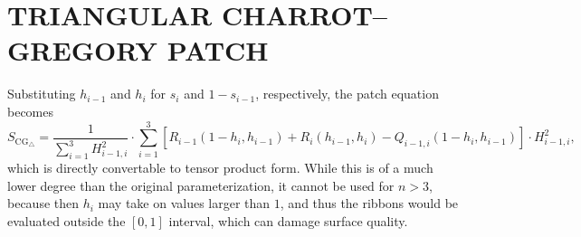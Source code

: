 \documentclass[9pt,academicons]{article}
\begin{document}
\section{TRIANGULAR CHARROT--GREGORY PATCH}
\label{app:triangular}
Substituting $h_{i-1}$ and $h_i$ for $s_i$ and $1-s_{i-1}$, respectively, the patch equation becomes
\begin{equation}
  S_\mathrm{CG_\triangle}= \frac{1}{\sum_{i=1}^3H_{i-1,i}^2}\cdot
  \sum_{i=1}^3\left[R_{i-1}(1-h_i,h_{i-1})+R_i(h_{i-1},h_i)-Q_{i-1,i}(1-h_i,h_{i-1})\right]
  \cdot H_{i-1,i}^2,
\end{equation}
which is directly convertable to tensor product form. While this is of a much lower degree
than the original parameterization, it cannot be used for $n>3$, because then
$h_i$ may take on values larger than $1$, and thus the ribbons would be evaluated outside
the $[0,1]$ interval, which can damage surface quality.




\bigskip
\end{document}
